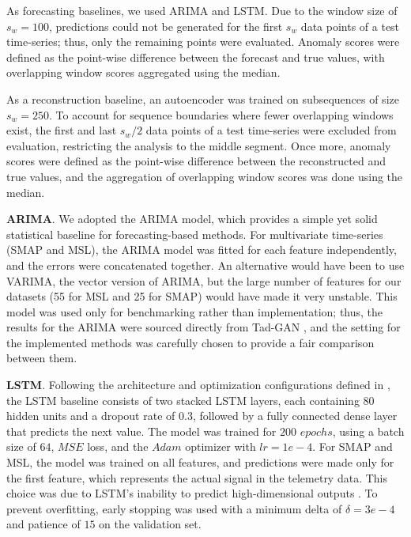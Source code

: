 As forecasting baselines, we used ARIMA and LSTM. Due to the window size of $s_w = 100$, predictions could not be generated for the first $s_w$ data points of a test time-series; thus, only the remaining points were evaluated. Anomaly scores were defined as the point-wise difference between the forecast and true values, with overlapping window scores aggregated using the median.  

As a reconstruction baseline, an autoencoder was trained on subsequences of size $s_w = 250$. To account for sequence boundaries where fewer overlapping windows exist, the first and last $s_w / 2$ data points of a test time-series were excluded from evaluation, restricting the analysis to the middle segment. Once more, anomaly scores were defined as the point-wise difference between the reconstructed and true values, and the aggregation of overlapping window scores was done using the median.

\textbf{ARIMA}. We adopted the ARIMA model, which provides a simple yet solid statistical baseline for forecasting-based methods. For multivariate time-series (SMAP and MSL), the ARIMA model was fitted for each feature independently, and the errors were concatenated together. An alternative would have been to use VARIMA, the vector version of ARIMA, but the large number of features for our datasets (55 for MSL and 25 for SMAP) would have made it very unstable. This model was used only for benchmarking rather than implementation; thus, the results for the ARIMA were sourced directly from Tad-GAN \cite{geiger2020tadgan}, and the setting for the implemented methods was carefully chosen to provide a fair comparison between them.

\textbf{LSTM}. Following the architecture and optimization configurations defined in \cite{hundman2018detecting}, the LSTM baseline consists of two stacked LSTM layers, each containing 80 hidden units and a dropout rate of $0.3$, followed by a fully connected dense layer that predicts the next value. The model was trained for $200$ $epochs$, using a batch size of $64$, $MSE$ loss, and the $Adam$ optimizer with $lr = 1e-4$. For SMAP and MSL, the model was trained on all features, and predictions were made only for the first feature, which represents the actual signal in the telemetry data. This choice was due to LSTM's inability to predict high-dimensional outputs \cite{hundman2018detecting}. To prevent overfitting, early stopping was used with a minimum delta of $\delta = 3e-4$ and patience of $15$ on the validation set.

